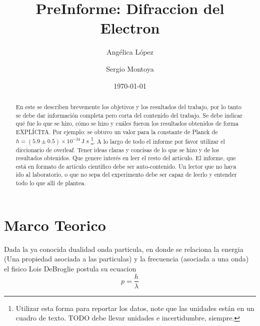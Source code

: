 \documentclass[a4paper, amsfonts, amssymb, amsmath, reprint, showkeys, nofootinbib, twoside]{revtex4-1}
\begin{document}
\title{PreInforme: Difraccion del Electron}

\author{Angélica López}
\author{Sergio Montoya}
  


\date{\today} %

\begin{abstract}

En este se describen brevemente los objetivos y los resultados del trabajo, por lo tanto se debe dar información completa pero corta del contenido del trabajo. Se debe indicar qué fue lo que se hizo, cómo se hizo y cuáles fueron los resultados obtenidos de forma EXPLÍCITA. Por ejemplo: se obtuvo un valor para la constante de Planck de $h=(5.9\pm 0.5)\times 10^{-34}\,\text{J s}$ \footnote{Utilizar esta forma para reportar los datos, note que las unidades están en un cuadro de texto. TODO debe llevar unidades e incertidumbre, siempre.}. A lo largo de todo el informe por favor utilizar el diccionario de overleaf. Tener ideas claras y concisas de lo que se hizo y de los resultados obtenidos. Que genere interés en leer el resto del artículo. El informe, que está en formato de artículo científico debe ser auto-contenido. Un lector que no haya ido al laboratorio, o que no sepa del experimento debe ser capaz de leerlo y entender todo lo que allí de plantea.

\end{abstract}

\maketitle

\section{Marco Teorico}

Dada la ya conocida dualidad onda particula, en donde se relaciona la energia (Una propiedad asociada a las particulas) y la frecuencia (asociada a una onda) el fisico Lois DeBroglie postula su ecuacion\cite{kittel}
\begin{equation}
  p = \frac{h}{\lambda}
  \label{eq:de-broglie}
\end{equation}
\end{document}
